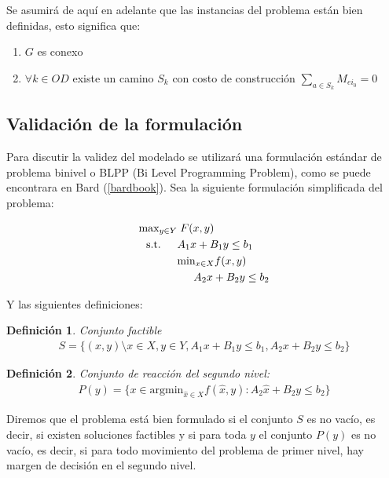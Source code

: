 \documentclass{article}
\newtheorem{definition}{Definición}
\newcommand{\modelspace}{\hspace{1.5em}}
\begin{document}
  Se asumirá de aquí en adelante que las instancias del problema están bien definidas, esto significa que:

  \begin{enumerate}
    \item {$G$ es conexo}
    \item {$\forall k \in OD$ existe un camino $S_k$ con costo de construcción $\sum_{a \in S_k} M_{ei_0} = 0$}
  \end{enumerate}

  \subsection*{Validación de la formulación}

  Para discutir la validez del modelado se utilizará una formulación estándar de problema binivel o BLPP (Bi Level Programming Problem), como se puede encontrara en Bard (\ref{bardbook}).
  Sea la siguiente formulación simplificada del problema:

  \begin{align}
    \text{max}_{y \in Y}    & \; F(x, y) \\
    \text{s.t.} \modelspace & A_1 x + B_1 y \leq b_1 \\
                            & \text{min}_{x \in X} f(x, y) \\
                            & \modelspace A_2 x + B_2 y \leq b_2
  \end{align}

  Y las siguientes definiciones:

  \begin{definition}
    Conjunto factible
    \begin{align}
      S = \{(x, y) \setminus x \in X, y \in Y, A_1 x + B_1 y \leq b_1, A_2 x + B_2 y \leq b_2 \}
    \end{align}
  \end{definition}

  \begin{definition}
    Conjunto de reacción del segundo nivel:
    \begin{align}
      P(y) = \{ x \in \text{argmin}_{\hat{x} \in X} f(\hat{x}, y) : A_2 \hat{x} + B_2 y \leq b_2 \}
    \end{align}
  \end{definition}

  Diremos que el problema está bien formulado si el conjunto $S$ es no vacío, es decir, si existen soluciones factibles y si para toda $y$ el conjunto $P(y)$ es no vacío, es decir, si para todo movimiento del problema de primer nivel, hay margen de decisión en el segundo nivel.
\end{document}
